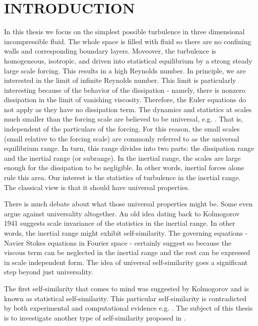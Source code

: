 
\chapter{INTRODUCTION} \label{ch:introduction}

In this thesis we focus on the simplest possible turbulence in three dimensional incompressible fluid.  The whole space is filled with fluid so there are no confining walls and corresponding boundary layers.  Moveover, the turbulence is homogeneous, isotropic, and driven into statistical equilibrium by a strong steady large scale forcing. This results in a high Reynolds number.  In principle, we are interested in the limit of infinite Reynolds number.  This limit is particularly interesting because of the behavior of the dissipation - namely, there is nonzero dissipation in the limit of vanishing viscosity.  Therefore, the Euler equations do not apply as they have no dissipation term.  The dynamics and statistics at scales much smaller than the forcing scale are believed to be universal, e.g. \cite{Frisch}.  That is, independent of the particulars of the forcing.  For this reason, the small scales (small relative to the forcing scale) are commonly referred to as the universal equilibrium range.  In turn, this range divides into two parts: the dissipation range and the inertial range (or subrange).  In the inertial range, the scales are large enough for the dissipation to be negligible. In other words, inertial forces alone rule this area.  Our interest is the statistics of turbulence in the inertial range.  The classical view is that it should have universal properties.

There is much debate about what those universal properties might be.  Some even argue against universality altogether. An old idea dating back to Kolmogorov 1941 \cite{Kolmogorov}  suggests scale invariance of the statistics in the inertial range.  In other words, the inertial range might exhibit self-similarity.  The governing equations - Navier Stokes equations in Fourier space - certainly suggest so because the viscous term can be neglected in the inertial range and the rest can be expressed in scale independent form. The idea of universal self-similarity goes a significant step beyond just universality.

The first self-similarity that comes to mind was suggested by Kolmogorov and is known as statistical self-similarity.  This particular self-similarity is contradicted by both experimental and computational evidence e.g. \cite{Frisch}.  The subject of this thesis is to investigate another type of self-similarity proposed in \cite{Melander2007, Melander2002, Melander2005}.

